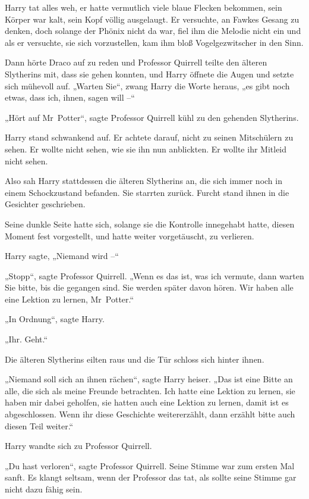 {Harry tat alles weh, er hatte vermutlich viele blaue Flecken bekommen, sein Körper war kalt, sein Kopf völlig ausgelaugt. Er versuchte, an Fawkes Gesang zu denken, doch solange der Phönix nicht da war, fiel ihm die Melodie nicht ein und als er versuchte, sie sich vorzustellen, kam ihm bloß Vogelgezwitscher in den Sinn.

Dann hörte Draco auf zu reden und Professor Quirrell teilte den älteren Slytherins mit, dass sie gehen konnten, und Harry öffnete die Augen und setzte sich mühevoll auf. „Warten Sie“, zwang Harry die Worte heraus, „es gibt noch etwas, dass ich, ihnen, sagen will --“

„Hört auf Mr~Potter“, sagte Professor Quirrell kühl zu den gehenden Slytherins.

Harry stand schwankend auf. Er achtete darauf, nicht zu seinen Mitschülern zu sehen. Er wollte nicht sehen, wie sie ihn nun anblickten. Er wollte ihr Mitleid nicht sehen.

Also sah Harry stattdessen die älteren Slytherins an, die sich immer noch in einem Schockzustand befanden. Sie starrten zurück. Furcht stand ihnen in die Gesichter geschrieben.

Seine dunkle Seite hatte sich, solange sie die Kontrolle innegehabt hatte, diesen Moment fest vorgestellt, und hatte weiter vorgetäuscht, zu verlieren.

Harry sagte, „Niemand wird --“

„Stopp“, sagte Professor Quirrell. „Wenn es das ist, was ich vermute, dann warten Sie bitte, bis die gegangen sind. Sie werden später davon hören. Wir haben alle eine Lektion zu lernen, Mr~Potter.“

„In Ordnung“, sagte Harry.

„Ihr. Geht.“

Die älteren Slytherins eilten raus und die Tür schloss sich hinter ihnen.

„Niemand soll sich an ihnen rächen“, sagte Harry heiser. „Das ist eine Bitte an alle, die sich als meine Freunde betrachten. Ich hatte eine Lektion zu lernen, sie haben mir dabei geholfen, sie hatten auch eine Lektion zu lernen, damit ist es abgeschlossen. Wenn ihr diese Geschichte weitererzählt, dann erzählt bitte auch diesen Teil weiter.“

Harry wandte sich zu Professor Quirrell.

„Du hast verloren“, sagte Professor Quirrell. Seine Stimme war zum ersten Mal sanft. Es klangt seltsam, wenn der Professor das tat, als sollte seine Stimme gar nicht dazu fähig sein.

}

